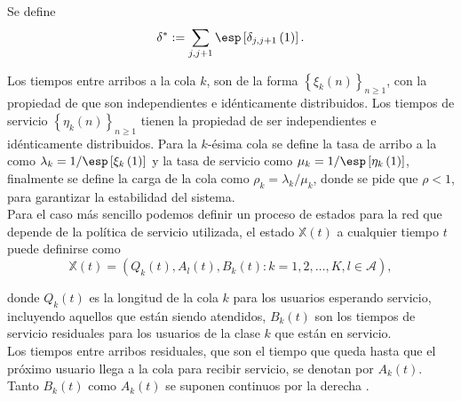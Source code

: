Se define
\begin{equation}
\delta^{*}:=\sum_{j,j+1}\esp\left[\delta_{j,j+1}\left(1\right)\right].
\end{equation}

Los tiempos entre arribos a la cola $k$, son de la forma
$\left\{\xi_{k}\left(n\right)\right\}_{n\geq1}$, con la propiedad
de que son independientes e id\'enticamente distribuidos. Los
tiempos de servicio
$\left\{\eta_{k}\left(n\right)\right\}_{n\geq1}$ tienen la
propiedad de ser independientes e id\'enticamente distribuidos.
Para la $k$-\'esima cola se define la tasa de arribo a la como
$\lambda_{k}=1/\esp\left[\xi_{k}\left(1\right)\right]$ y la tasa
de servicio como
$\mu_{k}=1/\esp\left[\eta_{k}\left(1\right)\right]$, finalmente se
define la carga de la cola como $\rho_{k}=\lambda_{k}/\mu_{k}$,
donde se pide que $\rho<1$, para garantizar la estabilidad del sistema.\\


Para el caso m\'as sencillo podemos definir un proceso de estados
para la red que depende de la pol\'itica de servicio utilizada, el
estado $\mathbb{X}\left(t\right)$ a cualquier tiempo $t$ puede
definirse como
\begin{equation}\label{Eq.Esp.Estados}
\mathbb{X}\left(t\right)=\left(Q_{k}\left(t\right),A_{l}\left(t\right),B_{k}\left(t\right):k=1,2,\ldots,K,l\in\mathcal{A}\right),
\end{equation}

donde $Q_{k}\left(t\right)$ es la longitud de la cola $k$ para los
usuarios esperando servicio, incluyendo aquellos que est\'an
siendo atendidos, $B_{k}\left(t\right)$ son los tiempos de
servicio residuales para los usuarios de la clase $k$ que est\'an
en servicio.\\

Los tiempos entre arribos residuales, que son el tiempo que queda
hasta que el pr\'oximo usuario llega a la cola para recibir
servicio, se denotan por $A_{k}\left(t\right)$. Tanto
$B_{k}\left(t\right)$ como $A_{k}\left(t\right)$ se suponen
continuos por la derecha \cite{Dai2}.\\

